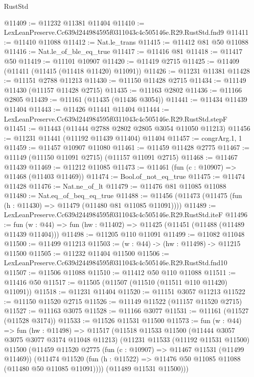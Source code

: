 \begin{lexlean}{RustStd}
\begin{coremodule}
@11409 := @11232 @11381 @11404
@11410 := LexLeanPreserve.Cc639d244984595f0311043c4c505146e.R29.RustStd.fnd9
@11411 := @11410 @11088
@11412 := Nat.le_trans
@11415 := @11412 @81 @50 @11088
@11416 := Nat.le_of_ble_eq_true
@11417 := @11416 @81
@11418 := @11417 @50
@11419 := @11101 @10907
@11420 := @11419 @2715
@11425 := @11409 (@11411 (@11415 (@11418 @11420) @11091))
@11426 := @11231 @11381
@11428 := @11151 @2788 @11213
@11430 := @11150 @11428 @2715
@11434 := @11149 @11430 (@11157 @11428 @2715)
@11435 := @11163 @2802
@11436 := @11166 @2805
@11439 := @11161 (@11435 (@11436 @3054))
@11441 := @11434 @11439 @11404
@11443 := @11426 @11441 @11404
@11444 := LexLeanPreserve.Cc639d244984595f0311043c4c505146e.R29.RustStd.stepF
@11451 := @11443 (@11444 @2788 @2802 @2805 @3054 @11050 @11213)
@11456 := @11231 @11441 (@11192 @11439 @11404) @11404
@11457 := congrArg.{1, 1}
@11459 := @11457 @10907 @11080
@11461 := @11459 @11428 @2775
@11467 := @11149 (@11150 @11091 @2715) (@11157 @11091 @2715)
@11468 := @11467 @11439
@11469 := @11212 @11085
@11473 := @11461 (fun (c : @10907) => @11468 (@11403 @11469))
@11474 := Bool.of_not_eq_true
@11475 := @11474 @11428
@11476 := Nat.ne_of_lt
@11479 := @11476 @81 @11085 @11088
@11480 := Nat.eq_of_beq_eq_true
@11488 := @11456 (@11473 (@11475 (fun (h : @11430) => @11479 (@11480 @81 @11085 @11091))))
@11489 := LexLeanPreserve.Cc639d244984595f0311043c4c505146e.R29.RustStd.iteF
@11496 := fun (w : @44) => fun (hw : @11402) => @11425 (@11451 (@11488 (@11489 @11439 @11404)))
@11498 := @11205 @110 @11091
@11499 := @11082 @11048
@11500 := @11499 @11213
@11503 := (w : @44) -> (hw : @11498) -> @11215 @11500
@11505 := @11232 @11404 @11500
@11506 := LexLeanPreserve.Cc639d244984595f0311043c4c505146e.R29.RustStd.fnd10
@11507 := @11506 @11088
@11510 := @11412 @50 @110 @11088
@11511 := @11416 @50
@11517 := @11505 (@11507 (@11510 (@11511 @110 @11420) @11091))
@11518 := @11231 @11404
@11520 := @11151 @3057 @11213
@11522 := @11150 @11520 @2715
@11526 := @11149 @11522 (@11157 @11520 @2715)
@11527 := @11163 @3075
@11528 := @11166 @3077
@11531 := @11161 (@11527 (@11528 @3174))
@11533 := @11526 @11531 @11500
@11573 := fun (w : @44) =>
  fun (hw : @11498) =>
  @11517
    (@11518
      @11533
      @11500
      (@11444 @3057 @3075 @3077 @3174 @11048 @11213)
      (@11231
        @11533
        (@11192 @11531 @11500)
        @11500
        (@11459
          @11520
          @2775
          (fun (c : @10907) => @11467 @11531 (@11499 @11469))
          (@11474 @11520 (fun (h : @11522) => @11476 @50 @11085 @11088 (@11480 @50 @11085 @11091))))
        (@11489 @11531 @11500)))

\end{coremodule}
\end{lexlean}
